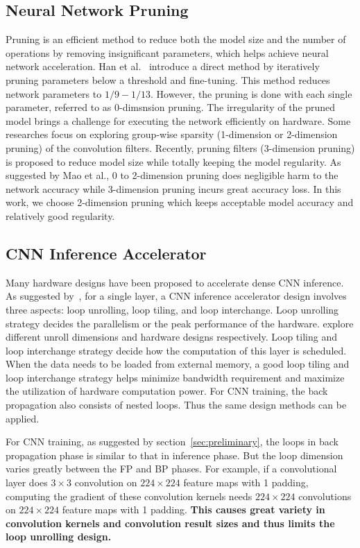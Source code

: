 \subsection{Neural Network Pruning}\label{sec:rw:prune}
Pruning is an efficient method to reduce both the model size and the number of operations by removing insignificant parameters, which helps achieve neural network acceleration. Han et al.~\cite{han2015learning} introduce a direct method by iteratively pruning parameters below a threshold and fine-tuning. This method reduces network parameters to $1/9-1/13$. However, the pruning is done with each single parameter, referred to as 0-dimsnsion pruning. The irregularity of the pruned model brings a challenge for executing the network efficiently on hardware. Some researches focus on exploring group-wise sparsity (1-dimension or 2-dimension pruning)\cite{lebedev2016fast,zhou2016less,wen2016learning} of the convolution filters. Recently, pruning filters (3-dimension pruning)\cite{molchanov2016pruning,li2016pruning} is proposed to reduce model size while totally keeping the model regularity. As suggested by Mao et al.\cite{mao2017exploring}, 0 to 2-dimension pruning does negligible harm to the network accuracy while 3-dimension pruning incurs great accuracy loss. In this work, we choose 2-dimension pruning which keeps acceptable model accuracy and relatively good regularity.

\subsection{CNN Inference Accelerator}\label{sec:rw:inference_acc}
Many hardware designs have been proposed to accelerate dense CNN inference. As suggested by~\cite{ma2017optimizing}, for a single layer, a CNN inference accelerator design involves three aspects: loop unrolling, loop tiling, and loop interchange. Loop unrolling strategy decides the parallelism or the peak performance of the hardware. \cite{zhang2015optimizing, du2015shidiannao, qiu2016going} explore different unroll dimensions and hardware designs respectively. Loop tiling and loop interchange strategy decide how the computation of this layer is scheduled. When the data needs to be loaded from external memory, a good loop tiling and loop interchange strategy helps minimize bandwidth requirement and maximize the utilization of hardware computation power. For CNN training, the back propagation also consists of nested loops. Thus the same design methods can be applied.

For CNN training, as suggested by section~\ref{sec:preliminary}, the loops in back propagation phase is similar to that in inference phase. But the loop dimension varies greatly between the FP and BP phases. For example, if a convolutional layer does $3\times 3$ convolution on $224\times 224$ feature maps with 1 padding, computing the gradient of these convolution kernels needs $224\times 224$ convolutions on $224\times 224$ feature maps with 1 padding. {\bf{This causes great variety in convolution kernels and convolution result sizes and thus limits the loop unrolling design.}} 

